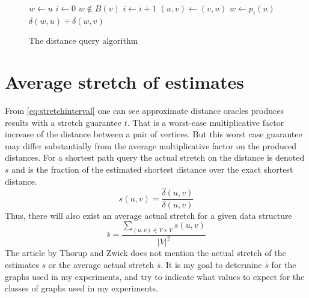 \begin{figure}[htbp]
\begin{codebox}
    \li $w \gets u$
    \li $i \gets 0$ 
    \li \While $w \notin B(v)$
    \li     \Do
                $i \gets i+1$
    \li         $(u,v) \gets (v,u)$
    \li         $w \gets p_{i}(u)$
            \End
    \li \Return $\delta(w,u) + \delta(w,v)$
\end{codebox}
\caption{The distance query algorithm}
\label{pseudo:dist}
\end{figure}

\section{Average stretch of estimates}
From \autoref{eq:stretchinterval} one can see approximate distance oracles
produces results with a stretch guarantee $t$. That is a worst-case multiplicative
factor increase of the distance between a pair of vertices. But this worst case
guarantee may differ substantially from the average multiplicative factor on the
produced distances. For a shortest path query the actual stretch on the distance is
denoted $s$ and is the fraction of the estimated shortest distance over
the exact shortest distance.
\begin{equation}
    s(u,v) = \frac{\hat{\delta}(u,v)}{\delta(u,v)}
\end{equation}
Thus, there will also exist an average actual stretch for a given data structure
\begin{equation}
    \bar{s} = \frac{\sum\limits_{(u,v) \in V \times V} s(u,v) }{|V|^2}
\end{equation}
The article by Thorup and Zwick\cite{tu} does not mention the actual stretch
of the estimates $s$ or the average actual stretch $\bar{s}$. It is my goal to
determine $\bar{s}$ for the graphs used in my experiments, and try to indicate
what values to expect for the classes of graphs used in my experiments.
